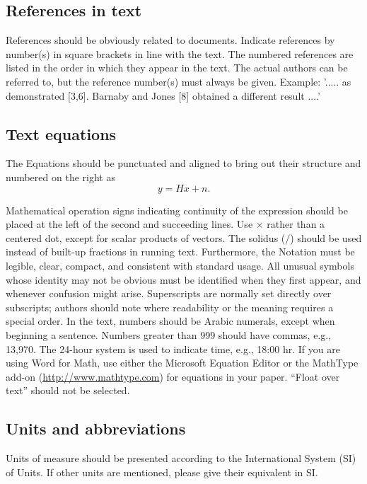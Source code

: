 \documentclass[final,3p,times,twocolumn]{elsarticle}
\begin{document}
\subsection{References in text}
References should be obviously related to documents. 
Indicate references by number(s) in square brackets in line with the text. 
The numbered references are listed in the order in which they appear in the text.
The actual authors can be referred to, but the reference number(s) must always be given. Example: '..... as demonstrated [3,6]. 
Barnaby and Jones [8] obtained a different result ....'

\subsection{Text equations}

The Equations should be punctuated and aligned to bring out their structure and numbered on the right as
\begin{equation}
y = Hx+n.
\end{equation}

Mathematical operation signs indicating continuity of the expression should be placed at the left of the second and succeeding lines. 
Use $\times$ rather than a centered dot, except for scalar products of vectors. 
The solidus ($\slash$) should be used instead of built-up fractions in running text. 
Furthermore, the Notation must be legible, clear, compact, and consistent with standard usage. 
All unusual symbols whose identity may not be obvious must be identified when they first appear, and whenever confusion might arise. 
Superscripts are normally set directly over subscripts; authors should note where readability or the meaning requires a special order. 
In the text, numbers should be Arabic numerals, except when beginning a sentence. 
Numbers greater than 999 should have commas, e.g., 13,970. 
The 24-hour system is used to indicate time, e.g., 18:00 hr. 
If you are using Word for Math, use either the Microsoft Equation Editor or the MathType add-on (\url{http://www.mathtype.com}) for equations in your paper.
“Float over text” should not be selected.

\subsection{Units and abbreviations}
Units of measure should be presented according to the International System (SI) of Units. If other units are mentioned, please give their equivalent in SI.
\end{document}
